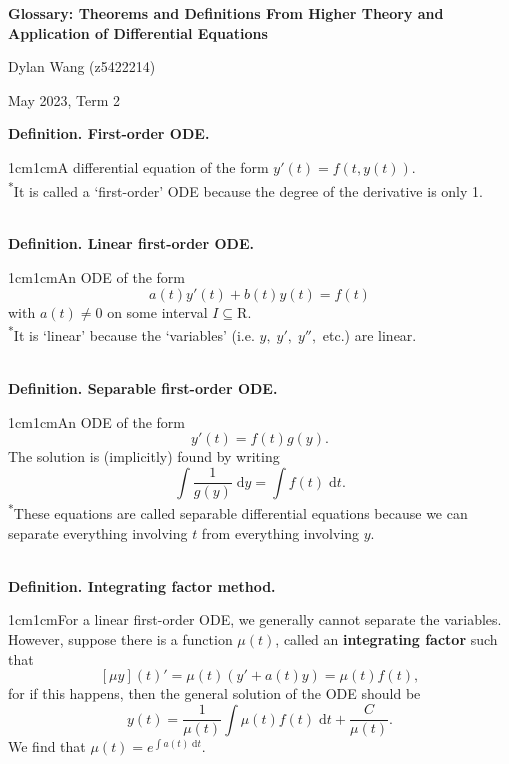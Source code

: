 \documentclass{article}
\newcommand{\definition}[2]{\textbf{Definition. #1.}\begin{adjustwidth}{1cm}{1cm}#2\end{adjustwidth}}
\begin{document}
\begin{titlepage}
    \centering
    \vspace*{\fill}

    \vspace*{0.5cm}

    \huge\bfseries
    Glossary: Theorems and Definitions From Higher Theory and Application of Differential Equations

    \vspace*{2cm}

    \large Dylan Wang (z5422214)

    \vspace*{2cm}

    \large May 2023, Term 2

    \vspace*{\fill}
\end{titlepage}
\newpage

\definition{First-order ODE}{A differential equation of the form $y'(t) = f(t, y(t)).$\\\textsuperscript{*}It is called a `first-order' ODE because the degree of the derivative is only 1.} ~\\
\definition{Linear first-order ODE}{An ODE of the form \[a(t)y'(t)+b(t)y(t)=f(t)\] with $a(t) \neq 0$ on some interval $I \subseteq \mathrm{R}$.\\\textsuperscript{*}It is `linear' because the `variables' (i.e. $y, \; y', \; y'',$ etc.) are linear.} ~\\
\definition{Separable first-order ODE}{An ODE of the form \[y'(t) = f(t)g(y).\]The solution is (implicitly) found by writing \[\int \frac{1}{g(y)} \; \mathrm{d}y = \int f(t) \; \mathrm{d}t.\]\textsuperscript{*}These equations are called separable differential equations because we can separate everything involving $t$ from everything involving $y$.} ~\\
\definition{Integrating factor method}{For a linear first-order ODE, we generally cannot separate the variables. However, suppose there is a function $\mu(t)$, called an \textbf{integrating factor} such that \[[\mu y](t)' = \mu(t)(y' + a(t)y) = \mu(t)f(t),\]for if this happens, then the general solution of the ODE should be \[y(t)=\frac{1}{\mu(t)}\int \mu(t) f(t) \; \mathrm{d}t + \frac{C}{\mu(t)}.\]We find that $\mu(t) = e^{\int a(t) \; \mathrm{d} t}.$}
\end{document}

